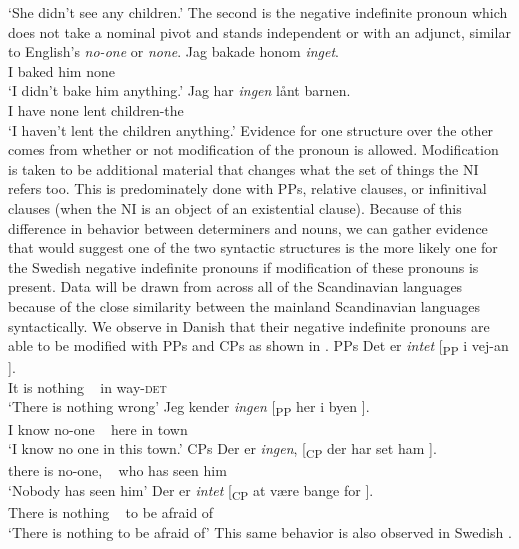 \documentclass[12pt, letterpaper]{article}
\begin{document}
		\glt `She didn't see any children.'
		\z  
	\ex The second is the negative indefinite pronoun which does not take a nominal pivot and stands independent or with an adjunct, similar to English's \emph{no-one} or \emph{none}.
		\ea 
		\gll Jag bakade honom \emph{inget}.\\
		I baked him none\\
		\glt `I didn't bake him anything.'
		\ex 
		\gll  Jag har \textit{ingen} lånt barnen.\\
		I have none lent children-the\\
		\glt `I haven't lent the children anything.'
		\z 
	\z
\ex Evidence for one structure over the other comes from whether or not modification of the pronoun is allowed. 
	\ea Modification is taken to be additional material that changes what the set of things the NI refers too. 
	\ex This is predominately done with PPs, relative clauses, or infinitival clauses (when the NI is an object of an existential clause).
	\z 
\ex Because of this difference in behavior between determiners and nouns, we can gather evidence that would suggest one of the two syntactic structures is the more likely one for the Swedish negative indefinite pronouns if modification of these pronouns is present.
\ex Data will be drawn from across all of the Scandinavian languages because of the close similarity between the mainland Scandinavian languages syntactically.
\ex We observe in Danish that their negative indefinite pronouns are able to be modified with PPs and CPs as shown in \citet[218ff]{allanDanishComprehensiveGrammar1995}.
	\ea PPs
		\ea 
		\gll Det er \textit{intet} [\textsubscript{PP} i vej-an ].\\
			It is nothing ~ in way-\textsc{det}\\
		\glt `There is nothing wrong'
		\ex 
		\gll Jeg kender \textit{ingen} [\textsubscript{PP} her i byen ].\\
			I know no-one ~ here in town\\
		\glt `I know no one in this town.'
		\z
	\ex CPs
		\ea 
		\gll Der er \textit{ingen}, [\textsubscript{CP} der har set ham ].\\
		there is no-one, ~ who has seen him\\
		\glt `Nobody has seen him'
		\ex
		\gll Der er \textit{intet} [\textsubscript{CP} at være bange for ].\\
		There is nothing ~ to be afraid of\\
		\glt `There is nothing to be afraid of'
		\z 
	\z
\ex This same behavior is also observed in Swedish \citep[197ff]{holmesSwedishComprehensiveGrammar2013}.
\end{document}
